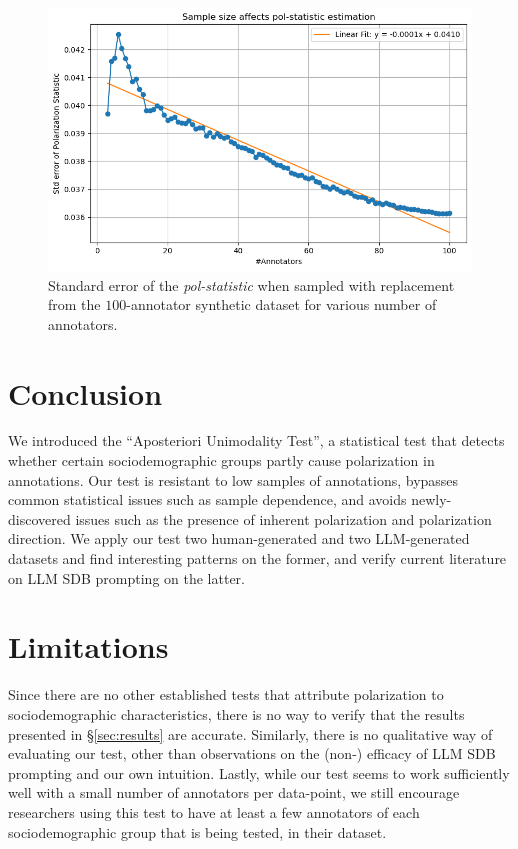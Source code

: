 \documentclass{article}
\begin{document}
\begin{figure}
	\includegraphics[width=\linewidth]{ndfu_std_error_sample_size.png}
	\caption{Standard error of the \textit{pol-statistic} when sampled with replacement from the $100$-annotator synthetic dataset for various number of annotators.}
	\label{fig::std_error}
\end{figure}


\section{Conclusion}

We introduced the ``Aposteriori Unimodality Test'', a statistical test that detects whether certain sociodemographic groups partly cause polarization in annotations. Our test is resistant to low samples of annotations, bypasses common statistical issues such as sample dependence, and avoids newly-discovered issues such as the presence of inherent polarization and polarization direction. We apply our test two human-generated and two \ac{LLM}-generated datasets and find interesting patterns on the former, and verify current literature on \ac{LLM} \ac{SDB} prompting on the latter.


\section{Limitations}

Since there are no other established tests that attribute polarization to sociodemographic characteristics, there is no way to verify that the results presented in \S\ref{sec:results} are accurate. Similarly, there is no qualitative way of evaluating our test, other than observations on the (non-) efficacy of \ac{LLM} {SDB} prompting and our own intuition. Lastly, while our test seems to work sufficiently well with a small number of annotators per data-point, we still encourage researchers using this test to have at least a few annotators of each sociodemographic group that is being tested, in their dataset.
\end{document}
